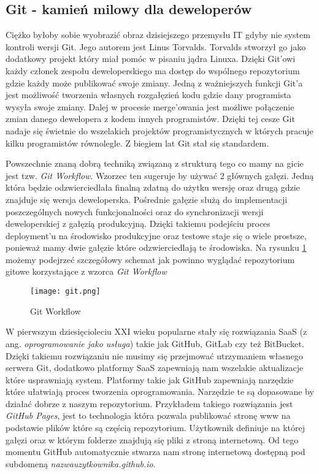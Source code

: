 \subsection{Git - kamień milowy dla deweloperów}
Ciężko byłoby sobie wyobrazić obraz dzisiejszego przemysłu IT gdyby nie system kontroli wersji Git. Jego autorem jest Linus Torvalds. Torvalds stworzył go jako dodatkowy projekt który miał pomóc w pisaniu jądra Linuxa. Dzięki Git'owi każdy członek zespołu deweloperskiego ma dostęp do wspólnego repozytorium gdzie każdy może publikować swoje zmiany. Jedną z ważniejszych funkcji Git'a jest możliwość tworzenia własnych rozgałęzień kodu gdzie dany programista wysyła swoje zmiany. Dalej w procesie merge'owania jest możliwe połączenie zmian danego dewelopera z kodem innych programistów. Dzięki tej cesze Git nadaje się świetnie do wszelakich projektów programistycznych w których pracuje kilku programistów równolegle. Z biegiem lat Git stał się standardem.
\par
Powszechnie znaną dobrą techniką związaną z strukturą tego co mamy na gicie jest tzw. \textit{Git Workflow}. Wzorzec ten sugeruje by używać 2 głównych gałęzi. Jedną która będzie odzwierciedlała finalną zdatną do użytku wersję oraz drugą gdzie znajduje się wersja deweloperska. Pośrednie gałęzie służą do implementacji poszczególnych nowych funkcjonalności oraz do synchronizacji wersji deweloperskiej z gałęzią produkcyjną. Dzięki takiemu podejściu proces deployment'u na środowisko produkcyjne oraz testowe staje się o wiele prostsze, ponieważ mamy dwie gałęzie które odzwierciedlają te środowiska. Na rysunku \ref{fig:git} możemy podejrzeć szczegółowy schemat jak powinno wyglądać repozytorium gitowe korzystające z wzorca \textit{Git Workflow}
\begin{figure}[htbp]
    \centering
    \texttt{[image: git.png]}
    \caption{Git Workflow}
    \label{fig:git}
\end{figure}
\par
W pierwszym dziesięcioleciu XXI wieku popularne stały się rozwiązania SaaS (z ang. \textit{oprogramowanie jako usługa}) takie jak GitHub, GitLab czy też BitBucket. Dzięki takiemu rozwiązaniu nie musimy się przejmować utrzymaniem własnego serwera Git, dodatkowo platformy SaaS zapewniają nam wszelakie aktualizacje które usprawniają system. Platformy takie jak GitHub zapewniają narzędzie które ułatwiają proces tworzenia oprogramowania. Narzędzie te są dopasowane by działać dobrze z naszym repozytorium. Przykładem takiego rozwiązania jest \textit{GitHub Pages}, jest to technologia która pozwala publikować stronę www na podstawie plików które są częścią repozytorium. Użytkownik definiuje na której gałęzi oraz w którym folderze znajdują się pliki z stroną internetową. Od tego momentu GitHub automatycznie stwarza nam stronę internetową dostępną pod subdomeną \textit{nazwauzytkownika.github.io}.

